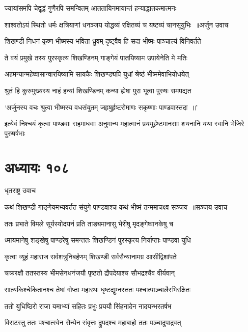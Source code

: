 \twolineshloka
{ज्यायांसमपि चेद्वृद्धं गुणैरपि समन्वितम्}
{आततायिनमायान्तं हन्याद्धातकमात्मनः}


\threelineshloka
{शाश्वतोऽयं स्थितो धर्मः क्षत्रियाणां धनञ्जय}
{योद्धव्यं रक्षितव्यं च यष्टव्यं चानसूयुभिः ॥अर्जुन उवाच}
{}


\twolineshloka
{शिखण्डी निधनं कृष्ण भीष्मस्य भविता ध्रुवम्}
{दृष्ट्वैव हि सदा भीष्मः पाञ्चाल्यं विनिवर्तते}


\twolineshloka
{ते वयं प्रमुखे तस्य पुरस्कृत्य शिखण्डिनम्}
{गाङ्गेयं पातयिष्याम उपायेनेति मे मतिः}


\twolineshloka
{अहमन्यान्महेष्वासान्वारयिष्यामि सायकैः}
{शिखण्ड्यपि युधां श्रेष्ठं भीष्ममेवाभियोधयेत्}


\twolineshloka
{श्रुतं हि कुरुमुख्यस्य नाहं हन्यां शिखण्डिनम्}
{कन्या ह्येषा पुरा भूत्वा पुरुषः समपद्यत}


\twolineshloka
{`अर्जुनस्य वचः श्रुत्वा भीष्मस्य वधसंयुतम्}
{जहृषुर्हृष्टरोमाणः सकृष्णाः पाण्डवास्तदा ॥'}


\threelineshloka
{इत्येवं निश्चयं कृत्वा पाण्डवाः सहमाधवाः}
{अनुमान्य महात्मानं प्रययुर्हृष्टमानसाः}
{शयनानि यथा स्वानि भेजिरे पुरुषर्षभाः}


\chapter{अध्यायः १०८}
\twolineshloka
{धृतराष्ट्र उवाच}
{}


\threelineshloka
{कथं शिखण्डी गाङ्गेयमभ्यवर्तत संयुगे}
{पाण्डवाश्च कथं भीष्मं तन्ममाचक्ष्व सञ्जय ॥सञ्जय उवाच}
{}


\twolineshloka
{ततः प्रभाते विमले सूर्यस्योदयनं प्रति}
{ताड्यमानासु भेरीषु मृदङ्गेष्वानकेषु च}


\twolineshloka
{ध्मायमानेषु शङ्खेषु पाण्डरेषु समन्ततः}
{शिखण्डिनं पुरस्कृत्य निर्याप्ताः पाण्डवा युधि}


\twolineshloka
{कृत्वा व्यूहं महाराज सर्वशत्रुनिबर्हणम्}
{शिखण्डी सर्वसैन्यानामग्र आसीद्विशांपते}


\twolineshloka
{चक्ररक्षौ ततस्तस्य भीमसेनधनंजयौ}
{पृष्ठतो द्रौपदेयाश्च सौभद्रश्चैव वीर्यवान्}


\twolineshloka
{सात्यकिश्चेकितानश्च तेषां गोप्ता महारथः}
{धृष्टद्युम्नस्ततः पश्चात्पाञ्चालैरभिरक्षितः}


\twolineshloka
{ततो युधिष्ठिरो राजा यमाभ्यां सहितः प्रभुः}
{प्रययौ सिंहनादेन नादयन्भरतर्षभ}


\twolineshloka
{विराटस्तु ततः पश्चात्स्वेन सैन्येन संवृत्तः}
{द्रुपदश्च महाबाहो ततः पञ्चादुपाद्रवत्}


